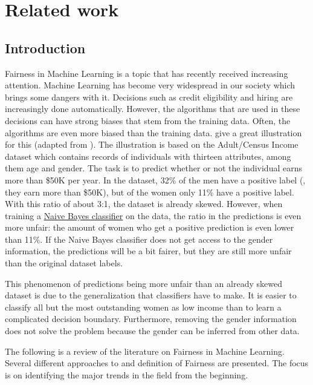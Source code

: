 \chapter{Related work}\label{ch:related-work}
\section{Introduction}\label{introduction}
Fairness in Machine Learning is a topic that has recently received increasing attention.
Machine Learning has become very widespread in our society
which brings some dangers with it.
Decisions such as credit eligibility and hiring are increasingly done automatically.
However, the algorithms that are used in these decisions can have strong biases
that stem from the training data.
Often, the algorithms are even more biased than the training data.
\citet{kamishima2011fairness} give a great illustration for this
(adapted from \citet{calders2010three}).
The illustration is based on the Adult/Census Income dataset \citep{kohavi1996scaling}
which contains records of individuals with thirteen attributes, among them age and gender.
The task is to predict whether or not the individual earns more than \$50K per year.
In the dataset, 32\% of the men have a positive label (\ie, they earn more than \$50K),
but of the women only 11\% have a positive label.
With this ratio of about 3:1, the dataset is already skewed.
However, when training a \href{https://en.wikipedia.org/wiki/Naive_Bayes_classifier}{Naive Bayes classifier} on the data,
the ratio in the predictions is even more unfair:
the amount of women who get a positive prediction is even lower than 11\%.
If the Naive Bayes classifier does not get access to the gender information,
the predictions will be a bit fairer,
but they are still more unfair than the original dataset labels.

This phenomenon of predictions being more unfair than an already skewed dataset
is due to the generalization that classifiers have to make.
It is easier to classify all but the most outstanding women as low income
than to learn a complicated decision boundary.
Furthermore, removing the gender information does not solve the problem
because the gender can be inferred from other data.

The following is a review of the literature on Fairness in Machine Learning.
Several different approaches to and definition of Fairness are presented.
The focus is on identifying the major trends in the field from the beginning.

